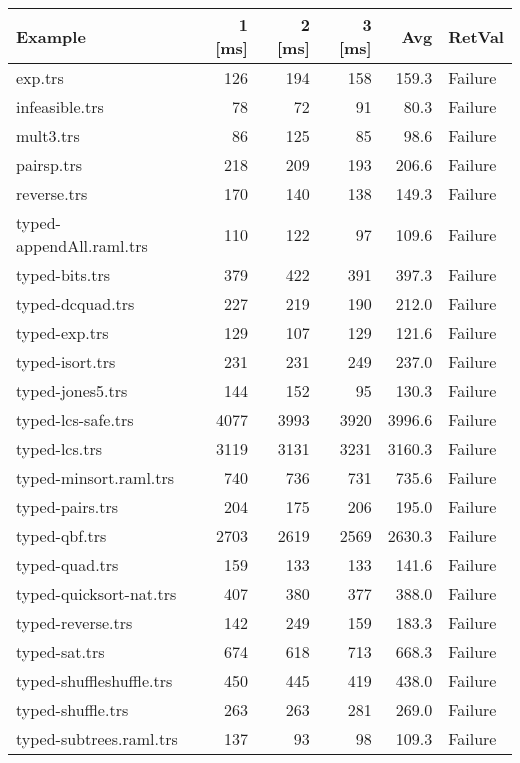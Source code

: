 \documentclass[11pt]{article}
\begin{document}
\begin{center}
\begin{tabular}{lrrrrl}
\hline
Example & 1 [ms] & 2 [ms] & 3 [ms] & Avg & RetVal\\
\hline
exp.trs & 126 & 194 & 158 & 159.3 & Failure\\
infeasible.trs & 78 & 72 & 91 & 80.3 & Failure\\
mult3.trs & 86 & 125 & 85 & 98.6 & Failure\\
pairsp.trs & 218 & 209 & 193 & 206.6 & Failure\\
reverse.trs & 170 & 140 & 138 & 149.3 & Failure\\
typed-appendAll.raml.trs & 110 & 122 & 97 & 109.6 & Failure\\
typed-bits.trs & 379 & 422 & 391 & 397.3 & Failure\\
typed-dcquad.trs & 227 & 219 & 190 & 212.0 & Failure\\
typed-exp.trs & 129 & 107 & 129 & 121.6 & Failure\\
typed-isort.trs & 231 & 231 & 249 & 237.0 & Failure\\
typed-jones5.trs & 144 & 152 & 95 & 130.3 & Failure\\
typed-lcs-safe.trs & 4077 & 3993 & 3920 & 3996.6 & Failure\\
typed-lcs.trs & 3119 & 3131 & 3231 & 3160.3 & Failure\\
typed-minsort.raml.trs & 740 & 736 & 731 & 735.6 & Failure\\
typed-pairs.trs & 204 & 175 & 206 & 195.0 & Failure\\
typed-qbf.trs & 2703 & 2619 & 2569 & 2630.3 & Failure\\
typed-quad.trs & 159 & 133 & 133 & 141.6 & Failure\\
typed-quicksort-nat.trs & 407 & 380 & 377 & 388.0 & Failure\\
typed-reverse.trs & 142 & 249 & 159 & 183.3 & Failure\\
typed-sat.trs & 674 & 618 & 713 & 668.3 & Failure\\
typed-shuffleshuffle.trs & 450 & 445 & 419 & 438.0 & Failure\\
typed-shuffle.trs & 263 & 263 & 281 & 269.0 & Failure\\
typed-subtrees.raml.trs & 137 & 93 & 98 & 109.3 & Failure\\
\hline
\end{tabular}

\end{center}
\end{document}
